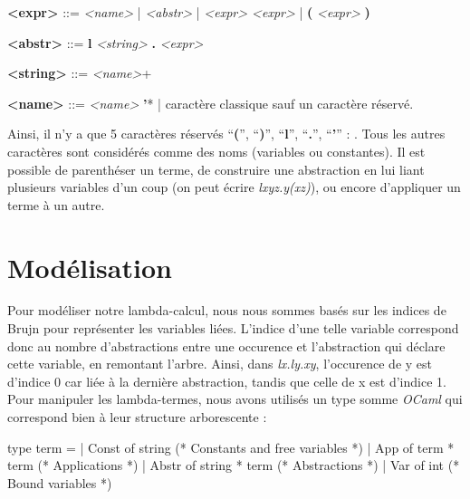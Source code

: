 \documentclass[11pt,a4paper]{report}
\begin{document}
\textbf{<expr>}  ::=  \textit{<name>}
           | \textit{<abstr>}
           | \textit{<expr> <expr>}
           | \textbf{(} \textit{<expr>} \textbf{)}

\textbf{<abstr>}  ::= \textbf{l} \textit{<string>} \textbf{.} \textit{<expr>}

\textbf{<string>}  ::= \textit{<name>}+

\textbf{<name>}  ::=  \textit{<name>} \textbf{'}*
           | caractère classique sauf un caractère réservé.

\medskip

Ainsi, il n'y a que 5 caractères réservés ``\textbf{(}'', ``\textbf{)}'', ``\textbf{l}'', ``\textbf{.}'', ``\textbf{'}'' : . Tous les autres caractères sont considérés comme des noms (variables ou constantes). Il est possible de parenthéser un terme, de construire une abstraction en lui liant plusieurs variables d'un coup (on peut écrire \textit{lxyz.y(xz)}), ou encore d'appliquer un terme à un autre.

\section{Modélisation}
\bigskip
Pour modéliser notre lambda-calcul, nous nous sommes basés sur les indices de Brujn pour représenter les variables liées. L'indice d'une telle variable correspond donc au nombre d'abstractions entre une occurence et l'abstraction qui déclare cette variable, en remontant l'arbre. Ainsi, dans \textit{lx.ly.xy}, l'occurence de y est d'indice 0 car liée à la dernière abstraction, tandis que celle de x est d'indice 1. Pour manipuler les lambda-termes, nous avons utilisés un type somme \textit{OCaml} qui correspond bien à leur structure arborescente :

\begin{OCaml}

type term =
| Const of string         (* Constants and free variables *)
| App of term * term      (* Applications *)  
| Abstr of string * term  (* Abstractions *)
| Var of int              (* Bound variables *)

\end{OCaml}
\end{document}
